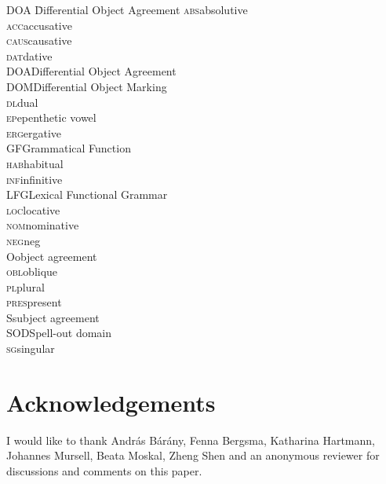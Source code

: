 \documentclass[output=paper
,modfonts
,nonflat]{langsci/langscibook}
\begin{document}
\begin{multicols}{2}
	\begin{tabbing}
		\textsc{DOA}\hspace{5mm} \= Differential Object Agreement\kill
		\textsc{abs}\>absolutive\\
		\textsc{acc}\>accusative\\ 
		\textsc{caus}\>causative\\
		\textsc{dat}\>dative\\
		\textsc{DOA}\>Differential Object Agreement\\
		\textsc{DOM}\>Differential Object Marking\\
		\textsc{dl}\>dual\\
		\textsc{ep}\>epenthetic vowel\\
		\textsc{erg}\>ergative\\
		\textsc{GF}\>Grammatical Function\\
		\textsc{hab}\>habitual\\
		\textsc{inf}\>infinitive\\
		\textsc{LFG}\>Lexical Functional Grammar\\
		\textsc{loc}\>locative\\
		\textsc{nom}\>nominative\\
		\textsc{neg}\>neg\\
		O\>object agreement\\
		\textsc{obl}\>oblique\\
		\textsc{pl}\>plural\\
		\textsc{pres}\>present\\
		S\>subject agreement\\
		SOD\>Spell-out domain\\
		\textsc{sg}\>singular\\
	\end{tabbing} 
\end{multicols}

\section*{Acknowledgements}

I would like to thank András Bárány, Fenna Bergsma, Katharina Hartmann, Johannes Mursell, Beata Moskal, Zheng Shen and an anonymous reviewer for discussions and comments on this paper.


{\sloppy
\printbibliography[heading=subbibliography,notkeyword=this]
}
\end{document}
